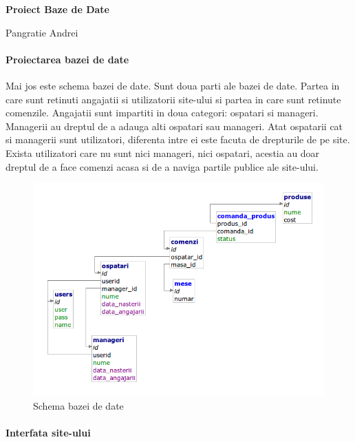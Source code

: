 \documentclass[12pt,english]{article}
\begin{document}
\begin{center}
\textbf{{\large Proiect Baze de Date}}

{\footnotesize{Pangratie Andrei}}
\end{center}

\paragraph{ Proiectarea bazei de date }

\begin{flushleft}
Mai jos este schema bazei de date. Sunt doua parti ale bazei de date. Partea in care sunt retinuti angajatii si utilizatorii site-ului si partea in care sunt retinute comenzile.
Angajatii sunt impartiti in doua categori: ospatari si manageri. Managerii au dreptul de a adauga alti ospatari sau manageri. Atat ospatarii cat si managerii sunt utilizatori, diferenta intre ei este facuta de drepturile de pe site. Exista utilizatori care nu sunt nici manageri, nici ospatari, acestia au doar dreptul de a face comenzi acasa si de a naviga partile publice ale site-ului. 
\end{flushleft}

\begin{figure}[H]
\includegraphics[width=1\textwidth]{schema.png}
\caption{Schema bazei de date}
\end{figure}

\paragraph{ Interfata site-ului }
\end{document}
